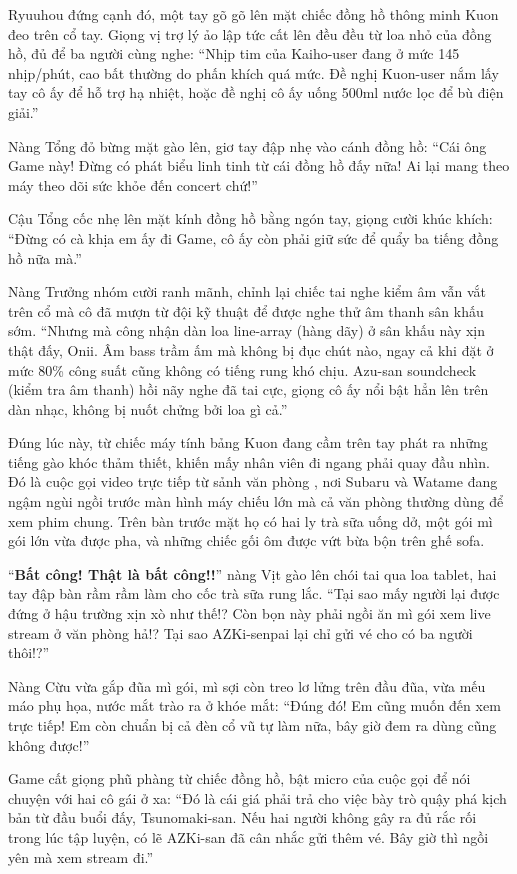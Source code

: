 \documentclass[../main.tex]{subfiles}
\begin{document}
Ryuuhou đứng cạnh đó, một tay gõ gõ lên mặt chiếc đồng hồ thông minh Kuon đeo trên cổ tay. Giọng vị trợ lý ảo lập tức cất lên đều đều từ loa nhỏ của đồng hồ, đủ để ba người cùng nghe: ``Nhịp tim của Kaiho-user đang ở mức 145 nhịp/phút, cao bất thường do phấn khích quá mức. Đề nghị Kuon-user nắm lấy tay cô ấy để hỗ trợ hạ nhiệt, hoặc đề nghị cô ấy uống 500ml nước lọc để bù điện giải.''

Nàng Tổng đỏ bừng mặt gào lên, giơ tay đập nhẹ vào cánh đồng hồ: ``Cái ông Game này! Đừng có phát biểu linh tinh từ cái đồng hồ đấy nữa! Ai lại mang theo máy theo dõi sức khỏe đến concert chứ!''

Cậu Tổng cốc nhẹ lên mặt kính đồng hồ bằng ngón tay, giọng cười khúc khích: ``Đừng có cà khịa em ấy đi Game, cô ấy còn phải giữ sức để quẩy ba tiếng đồng hồ nữa mà.''

Nàng Trưởng nhóm cười ranh mãnh, chỉnh lại chiếc tai nghe kiểm âm vẫn vắt trên cổ mà cô đã mượn từ đội kỹ thuật để được nghe thử âm thanh sân khấu sớm. ``Nhưng mà công nhận dàn loa line-array (hàng dãy) ở sân khấu này xịn thật đấy, Onii. Âm bass trầm ấm mà không bị đục chút nào, ngay cả khi đặt ở mức 80\% công suất cũng không có tiếng rung khó chịu. Azu-san soundcheck (kiểm tra âm thanh) hồi nãy nghe đã tai cực, giọng cô ấy nổi bật hẳn lên trên dàn nhạc, không bị nuốt chửng bởi loa gì cả.''

Đúng lúc này, từ chiếc máy tính bảng Kuon đang cầm trên tay phát ra những tiếng gào khóc thảm thiết, khiến mấy nhân viên đi ngang phải quay đầu nhìn. Đó là cuộc gọi video trực tiếp từ sảnh văn phòng \hll, nơi Subaru và Watame đang ngậm ngùi ngồi trước màn hình máy chiếu lớn mà cả văn phòng thường dùng để xem phim chung. Trên bàn trước mặt họ có hai ly trà sữa uống dở, một gói mì gói lớn vừa được pha, và những chiếc gối ôm được vứt bừa bộn trên ghế sofa.

``\textbf{Bất công! Thật là bất công!!}'' nàng Vịt gào lên chói tai qua loa tablet, hai tay đập bàn rầm rầm làm cho cốc trà sữa rung lắc. ``Tại sao mấy người lại được đứng ở hậu trường xịn xò như thế!? Còn bọn này phải ngồi ăn mì gói xem live stream ở văn phòng hả!? Tại sao AZKi-senpai lại chỉ gửi vé cho có ba người thôi!?''

Nàng Cừu vừa gắp đũa mì gói, mì sợi còn treo lơ lửng trên đầu đũa, vừa mếu máo phụ họa, nước mắt trào ra ở khóe mắt: ``Đúng đó! Em cũng muốn đến xem trực tiếp! Em còn chuẩn bị cả đèn cổ vũ tự làm nữa, bây giờ đem ra dùng cũng không được!''

Game cất giọng phũ phàng từ chiếc đồng hồ, bật micro của cuộc gọi để nói chuyện với hai cô gái ở xa: ``Đó là cái giá phải trả cho việc bày trò quậy phá kịch bản từ đầu buổi đấy, Tsunomaki-san. Nếu hai người không gây ra đủ rắc rối trong lúc tập luyện, có lẽ AZKi-san đã cân nhắc gửi thêm vé. Bây giờ thì ngồi yên mà xem stream đi.''
\end{document}
